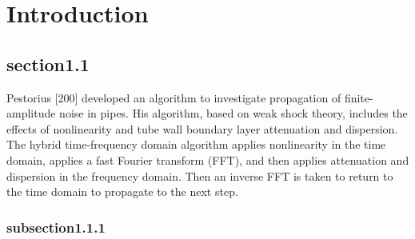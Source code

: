 \vspace*{-80mm}
\chapter{Introduction} \label{chapter1:introduction}

\section{section1.1}
Pestorius [200] developed an algorithm to investigate propagation of finite-am\-pli\-tude noise in pipes. His algorithm, based on weak shock theory, includes the effects of nonlinearity and tube wall boundary layer attenuation and dispersion. The hybrid time-frequency domain algorithm applies nonlinearity in the time domain, applies a fast Fourier transform (FFT), and then applies attenuation and dispersion in the frequency domain.  Then an inverse FFT is taken to return to the time domain to propagate to the next step.

\subsection{subsection1.1.1}

